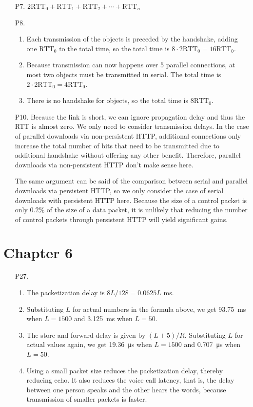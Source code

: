 \documentclass{article}
\begin{document}
\begin{enumerate}
    \item[P7.] $2\mathrm{RTT}_0 + \mathrm{RTT}_1 + \mathrm{RTT}_2 + \cdots + \mathrm{RTT}_n$

    \item[P8.] \begin{enumerate}
        \item Each transmission of the objects is preceded by the handshake, adding one $\mathrm{RTT}_0$ to the total time, so the total time is $8 \cdot 2\mathrm{RTT}_0 = 16\mathrm{RTT}_0$.
        \item Because transmission can now happens over 5 parallel connections, at most two objects must be transmitted in serial. The total time is $2 \cdot 2\mathrm{RTT}_0 = 4\mathrm{RTT}_0$.
        \item There is no handshake for objects, so the total time is $8\mathrm{RTT}_0$.
    \end{enumerate}

    \item[P10.] Because the link is short, we can ignore propagation delay and thus the RTT is almost zero. We only need to consider transmission delays. In the case of parallel downloads via non-persistent HTTP, additional connections only increase the total number of bits that need to be transmitted due to additional handshake without offering any other benefit. Therefore, parallel downloads via non-persistent HTTP don't make sense here.

    The same argument can be said of the comparison between serial and parallel downloads via persistent HTTP, so we only consider the case of serial downloads with persistent HTTP here. Because the size of a control packet is only 0.2\% of the size of a data packet, it is unlikely that reducing the number of control packets through persistent HTTP will yield significant gains.
\end{enumerate}

\section*{Chapter 6}

\begin{enumerate}
    \item[P27.] \begin{enumerate}
        \item The packetization delay is $8L / 128 = 0.0625L$ ms.
        \item Substituting $L$ for actual numbers in the formula above, we get \SI{93.75}{ms} when $L = 1500$ and \SI{3.125}{ms} when $L = 50$.
        \item The store-and-forward delay is given by $(L + 5)/R$. Substituting $L$ for actual values again, we get \SI{19.36}{\micro\second} when $L = 1500$ and \SI{0.707}{\micro\second} when $L = 50$.
        \item Using a small packet size reduces the packetization delay, thereby reducing echo. It also reduces the voice call latency, that is, the delay between one person speaks and the other hears the words, because transmission of smaller packets is faster.
    \end{enumerate}
\end{enumerate}
\end{document}

